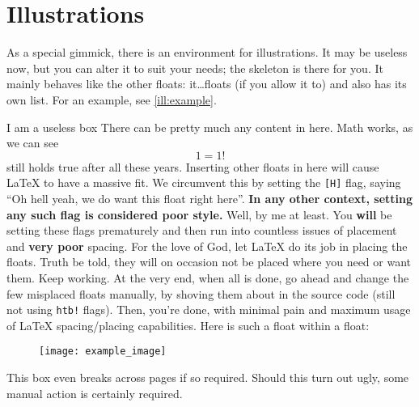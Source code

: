\section{Illustrations}
As a special gimmick, there is an environment for illustrations.
It may be useless now, but you can alter it to suit your needs; the skeleton is there for you.
It mainly behaves like the other floats: it\dots floats (if you allow it to) and also has its own list.
For an example, see \cref{ill:example}.

\begin{illustration}{I am a useless box}\label{ill:example}
	There can be pretty much any content in here.
	Math works, as we can see
	\begin{equation}
	1 = 1!
	\end{equation}
	still holds true after all these years.
	Inserting other floats in here will cause \LaTeX{} to have a massive fit.
	We circumvent this by setting the \verb|[H]| flag, saying \enquote{Oh hell yeah, we do want this float right here}.
	\textbf{In any other context, setting any such flag is considered poor style.}
	Well, by me at least.
	You \textbf{will} be setting these flags prematurely and then run into countless issues of placement and \textbf{very poor} spacing.
	For the love of God, let \LaTeX{} do its job in placing the floats.
	Truth be told, they will on occasion not be placed where you need or want them.
	Keep working.
	At the very end, when all is done, go ahead and change the few misplaced floats manually, by shoving them about in the source code (still not using \verb|htb!| flags).
	Then, you're done, with minimal pain and maximum usage of \LaTeX{} spacing/placing capabilities.
	Here is such a float within a float:
	\begin{figure}[H]
		{%
			\texttt{[image: example\_image]}
		}
	\end{figure}
	This box even breaks across pages if so required.
	Should this turn out ugly, some manual action is certainly required.
\end{illustration}